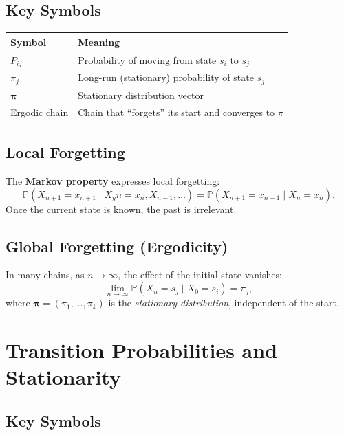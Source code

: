 \subsection*{Key Symbols}

\begin{center}
\begin{tabular}{ll}
\toprule
\textbf{Symbol} & \textbf{Meaning} \\
\midrule
$P_{ij}$ & Probability of moving from state $s_i$ to $s_j$ \\
$\pi_j$ & Long-run (stationary) probability of state $s_j$ \\
$\boldsymbol{\pi}$ & Stationary distribution vector \\
Ergodic chain & Chain that “forgets” its start and converges to $\pi$ \\
\bottomrule
\end{tabular}
\end{center}

\subsection*{Local Forgetting}

The \textbf{Markov property} expresses local forgetting:
\[
\mathbb{P}(X_{n+1} = x_{n+1} \mid X_yn = x_n, X_{n-1}, \dots)
= \mathbb{P}(X_{n+1} = x_{n+1} \mid X_n = x_n).
\]
Once the current state is known, the past is irrelevant.

\subsection*{Global Forgetting (Ergodicity)}

In many chains, as $n \to \infty$, the effect of the initial state vanishes:
\[
\lim_{n \to \infty} \mathbb{P}(X_n = s_j \mid X_0 = s_i) = \pi_j,
\]
where $\boldsymbol{\pi} = (\pi_1, \dots, \pi_k)$ is the \emph{stationary distribution}, independent of the start.



\section{Transition Probabilities and Stationarity}

\subsection*{Key Symbols}

